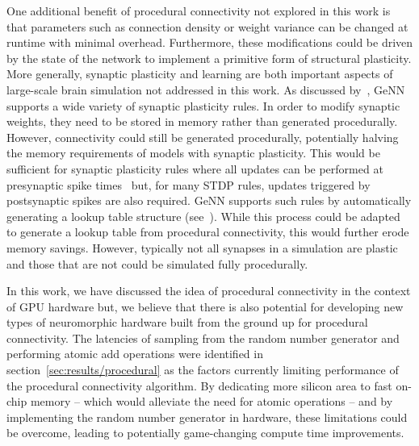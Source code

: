\documentclass[9pt,a4paper]{amsart}
\begin{document}
One additional benefit of procedural connectivity not explored in this work is that parameters such as connection density or weight variance can be changed at runtime with minimal overhead.
Furthermore, these modifications could be driven by the state of the network to implement a primitive form of structural plasticity.
More generally, synaptic plasticity and learning are both important aspects of large-scale brain simulation not addressed in this work.
As discussed by~\citet{Knight2018}, GeNN supports a wide variety of synaptic plasticity rules.
In order to modify synaptic weights, they need to be stored in memory rather than generated procedurally.
However, connectivity could still be generated procedurally, potentially halving the memory requirements of models with synaptic plasticity.
This would be sufficient for synaptic plasticity rules where all updates can be performed at presynaptic spike times~\citep{Brader2007,Clopath2010c} but, for many STDP rules, updates triggered by postsynaptic spikes are also required.
GeNN supports such rules by automatically generating a lookup table structure (see~\citet{Knight2018}).
While this process could be adapted to generate a lookup table from procedural connectivity, this would further erode memory savings.
However, typically not all synapses in a simulation are plastic and those that are not could be simulated fully procedurally.

In this work, we have discussed the idea of procedural connectivity in the context of GPU hardware but, we believe that there is also potential for developing new types of neuromorphic hardware built from the ground up for procedural connectivity.
The latencies of sampling from the random number generator and performing atomic add operations were identified in section~\ref{sec:results/procedural} as the factors currently limiting performance of the procedural connectivity algorithm.
By dedicating more silicon area to fast on-chip memory -- which would alleviate the need for atomic operations -- and by implementing the random number generator in hardware, these limitations could be overcome, leading to potentially game-changing compute time improvements.
\end{document}
